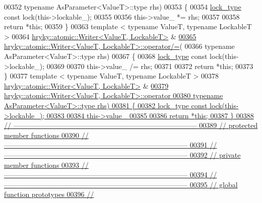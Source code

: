 \begin{DoxyCode}
{00352     \textcolor{keyword}{typename} AsParameter<ValueT>::type rhs)
00353 \{
00354     \hyperlink{classhryky_1_1exclusion_1_1_lock}{lock_type} \textcolor{keyword}{const} lock(this->lockable\_);
00355 
00356     this->value\_ *= rhs;
00357     
00358     \textcolor{keywordflow}{return} *\textcolor{keyword}{this};
00359 \}
00363 \textcolor{keyword}{template} < \textcolor{keyword}{typename} ValueT, \textcolor{keyword}{typename} LockableT >
00364 \hyperlink{classhryky_1_1atomic_1_1_writer}{hryky::atomic::Writer<ValueT, LockableT>} & 
\hypertarget{atomic__writer_8h_source_l00365}{}\hyperlink{group__atomic__operation_ga1f4841e2995310212eb4762cd3717e6b}{00365} \hyperlink{classhryky_1_1atomic_1_1_writer}{hryky::atomic::Writer<ValueT, LockableT>::operator/=}(
00366     \textcolor{keyword}{typename} AsParameter<ValueT>::type rhs)
00367 \{
00368     \hyperlink{classhryky_1_1exclusion_1_1_lock}{lock_type} \textcolor{keyword}{const} lock(this->lockable\_);
00369 
00370     this->value\_ /= rhs;
00371     
00372     \textcolor{keywordflow}{return} *\textcolor{keyword}{this};
00373 \}
00377 \textcolor{keyword}{template} < \textcolor{keyword}{typename} ValueT, \textcolor{keyword}{typename} LockableT >
00378 \hyperlink{classhryky_1_1atomic_1_1_writer}{hryky::atomic::Writer<ValueT, LockableT>} & 
\hypertarget{atomic__writer_8h_source_l00379}{}\hyperlink{group__atomic__operation_ga4dcb98887412fd19c46efb2478f87277}{00379} \hyperlink{classhryky_1_1atomic_1_1_writer}{hryky::atomic::Writer<ValueT, LockableT>::operator%
00380     \textcolor{keyword}{typename} AsParameter<ValueT>::type rhs)
00381 \{
00382     \hyperlink{classhryky_1_1exclusion_1_1_lock}{lock_type} \textcolor{keyword}{const} lock(this->lockable\_);
00383 
00384     this->value\_ %
00385     
00386     \textcolor{keywordflow}{return} *\textcolor{keyword}{this};
00387 \}
00388 \textcolor{comment}{//
      ------------------------------------------------------------------------------}
00389 \textcolor{comment}{// protected member functions}
00390 \textcolor{comment}{//
      ------------------------------------------------------------------------------}
00391 \textcolor{comment}{//
      ------------------------------------------------------------------------------}
00392 \textcolor{comment}{// private member functions}
00393 \textcolor{comment}{//
      ------------------------------------------------------------------------------}
00394 \textcolor{comment}{//
      ------------------------------------------------------------------------------}
00395 \textcolor{comment}{// global function prototypes}
00396 \textcolor{comment}{//
}}}
\end{DoxyCode}
